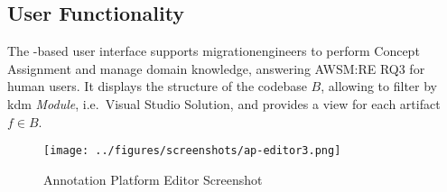 \vspace{-35pt}
\hypertarget{sec:re.impl.features}{%
\subsection{User Functionality}\label{sec:re.impl.features}}
\vspace{10pt}

The -based user interface supports \glspl{migrationengineer} to perform \gls{Concept Assignment} and manage domain knowledge, answering AWSM:RE RQ3 for human users.
It displays the structure of the  codebase \(B\), allowing to filter by \gls{kdm} \emph{Module}, i.e.~Visual Studio Solution, and provides a view for each \gls{artifact} \(f \in B\).

\begin{figure}[h!]
\hypertarget{fig:awsmap.editor}{%
\centering
\texttt{[image: ../figures/screenshots/ap-editor3.png]}
\caption{Annotation Platform Editor Screenshot}\label{fig:awsmap.editor}
}
\end{figure}
\vspace{-5pt}

